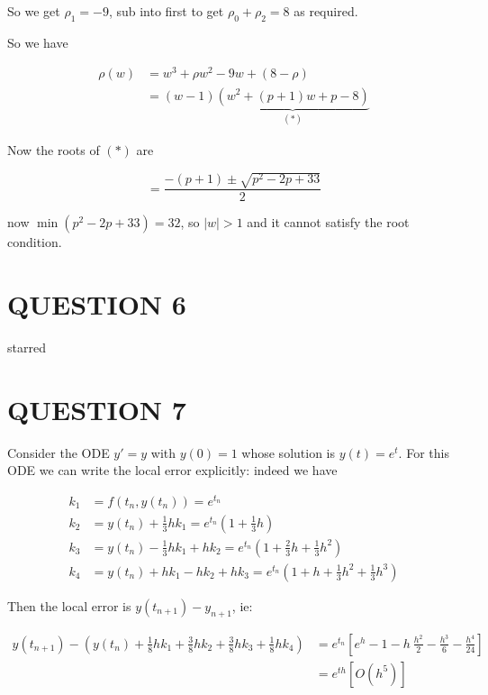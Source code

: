 \documentclass[a4paper]{article}
\begin{document}
So we get $ \rho_{1} = - 9 $, sub into first to get $ \rho_{0} + \rho_{2} = 8 $ as required.  

 

So we have 

\begin{align*}
\rho(w) & = w^{3} + \rho w^{2} - 9 w + (8 - \rho) \\
& = (w - 1)\underbrace{(w^{2} + (p+1)w + p - 8)}_{(*)}
\end{align*}

Now the roots of $ (*) $ are 

\[ = \frac{-(p+1)  \pm \sqrt{p^{2} - 2p + 33}}{2} \]

now $ \min(p^{2} - 2p + 33) = 32 $, so $ | w | > 1 $ and it cannot satisfy the root condition. 









\section{QUESTION 6}

starred


\section{QUESTION 7}

Consider the ODE $ y' = y $ with $ y(0) = 1 $ whose solution is $ y(t) = e^{t} $. For this ODE we can write the local error explicitly: indeed we have 

\begin{align*}
k_{1} & = f(t_{n},y(t_{n})) = e^{t_{n}} \\
k_{2} & = y(t_{n}) + \frac{1}{3} h k_{1} = e^{t_{n}} (1 + \frac{1}{3} h) \\
k_{3} & = y(t_{n}) - \frac{1}{3} h k_{1} + h k_{2} = e^{t_{n}}\left(  1 + \frac{2}{3}h + \frac{1}{3} h^{2}  \right)    \\
k_{4} & =  y(t_{n}) + h k_{1} - h k_{2} + h k_{3} = e^{t_{n}}\left(  1 + h + \frac{1}{3} h^{2} + \frac{1}{3} h^{3} \right) 
\end{align*} 

Then the local error is $ y(t_{n+1}) - y_{n+1} $, ie:

\begin{align*}
y(t_{n+1}) -  ( y(t_{n}) + \frac{1}{8} h k_{1} + \frac{3}{8} h k_{2} + \frac{3}{8} h k_{3} + \frac{1}{8} h k_{4}   ) & =  e^{t_{n}}\left[   e^{h} - 1 - h \ \frac{h^{2}}{2} - \frac{h^{3}}{6} - \frac{h^{4}}{24} \right]  \\
& = e^{th} \left[  O(h^{5}) \right] 
\end{align*}
\end{document}
